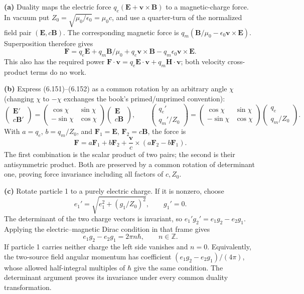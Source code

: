 \textbf{(a)} Duality maps the electric force $q_e(\mathbf E+\mathbf v\times\mathbf B)$
to a magnetic-charge force. In vacuum put
$Z_0=\sqrt{\mu_0/\epsilon_0}=\mu_0c$, and use a quarter-turn of the
normalized field pair $(\mathbf E,c\mathbf B)$. The corresponding magnetic
force is
$q_m(\mathbf B/\mu_0-\epsilon_0\mathbf v\times\mathbf E)$.
Superposition therefore gives
\[
\boxed{\mathbf F=q_e\mathbf E+q_m\mathbf B/\mu_0
+q_e\mathbf v\times\mathbf B-q_m\epsilon_0\mathbf v\times\mathbf E.}
\]
This also has the required power $\mathbf F\cdot\mathbf v
=q_e\mathbf E\cdot\mathbf v+q_m\mathbf H\cdot\mathbf v$;
both velocity cross-product terms do no work.

\textbf{(b)} Express (6.151)--(6.152) as a common rotation by an arbitrary
angle $\chi$ (changing $\chi$ to $-\chi$ exchanges the book's primed/unprimed
convention):
\[
\begin{pmatrix}\mathbf E'\\c\mathbf B'\end{pmatrix}
=\begin{pmatrix}\cos\chi&\sin\chi\\-\sin\chi&\cos\chi\end{pmatrix}
\begin{pmatrix}\mathbf E\\c\mathbf B\end{pmatrix},\qquad
\begin{pmatrix}q_e'\\q_m'/Z_0\end{pmatrix}
=\begin{pmatrix}\cos\chi&\sin\chi\\-\sin\chi&\cos\chi\end{pmatrix}
\begin{pmatrix}q_e\\q_m/Z_0\end{pmatrix}.
\]
With $a=q_e$, $b=q_m/Z_0$, and $\mathbf F_1=\mathbf E$,
$\mathbf F_2=c\mathbf B$, the force is
\[
\mathbf F=a\mathbf F_1+b\mathbf F_2
+\frac{\mathbf v}{c}\times(a\mathbf F_2-b\mathbf F_1).
\]
The first combination is the scalar product of two pairs; the second is
their antisymmetric product. Both are preserved by a common rotation of
determinant one, proving force invariance including all factors of $c,Z_0$.

\textbf{(c)} Rotate particle 1 to a purely electric charge. If it is
nonzero, choose
\[
 e_1'=\sqrt{e_1^2+(g_1/Z_0)^2},\qquad g_1'=0.
\]
The determinant of the two charge vectors is invariant, so
$e_1'g_2'=e_1g_2-e_2g_1$. Applying the electric--magnetic Dirac condition
in that frame gives
\[
\boxed{e_1g_2-e_2g_1=2\pi n\hbar,\qquad n\in\mathbb Z.}
\]
If particle 1 carries neither charge the left side vanishes and $n=0$.
Equivalently, the two-source field angular momentum has coefficient
$(e_1g_2-e_2g_1)/(4\pi)$, whose allowed half-integral multiples of $\hbar$
give the same condition. The determinant argument proves its invariance
under every common duality transformation.

